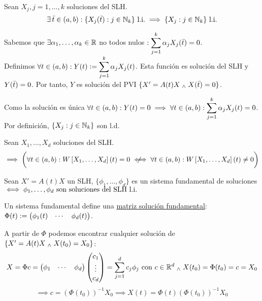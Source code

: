\begin{lem}
	Sean $X_j, j = 1, \dots, k$ soluciones del SLH.
	\[\exists \, \Bar{t} \in (a, b) : \{X_j(\Bar{t}) : j \in \mathbb{N}_k\} \text{ l.i.} \implies \{X_j : j \in \mathbb{N}_k\} \text{ l.i.}\]
	\begin{dem}
		Sabemos que $\exists \alpha_1, \dots, \alpha_k \in \mathbb{R}$ no todos nulos $ : \displaystyle \sum_{j=1}^{k} \alpha_j X_j(\Bar{t}) =0$. \\
		Definimos $\displaystyle \forall t \in (a,b) : Y(t) \vcentcolon= \sum_{j=1}^{k} \alpha_j X_j(t)$. Esta función es solución del SLH y $Y(\Bar{t}) = 0$. Por tanto, $Y$ es solución del PVI $\{X' = A(t)X \; _{\wedge} \; X(\Bar{t}) = 0\}$.

		Como la solución es única $\displaystyle \forall t\in (a, b) : Y(t) = 0 \implies \forall t\in (a, b) : \sum_{j=1}^{k} \alpha_j X_j(t) = 0$.\\
		Por definición, $\{X_j : j \in \mathbb{N}_k\}$ son l.d.
	\end{dem}
\end{lem}

\begin{prop}
	Sean $X_1, \dots, X_d$ soluciones del SLH.
	\[\implies \bigg(\forall t \in (a, b) : W\left[X_1, \dots, X_d\right](t) = 0 \niff  \forall t \in (a, b) : W\left[X_1, \dots, X_d\right](t) \neq 0\bigg)\]
\end{prop}


\begin{defn}
	Sean $X'=A(t)X$ un SLH, $\{\phi_1, \dots, \phi_d\}$ es un sistema fundamental de soluciones $\iff \phi_1, \dots, \phi_d\text{ son soluciones del SLH l.i.}$
\end{defn}

Un sistema fundamental define una \underline{matriz solución fundamental}: $\displaystyle \Phi(t) \vcentcolon= \begin{pmatrix}
		\phi_1(t) & \cdots & \phi_d(t)
	\end{pmatrix}$.

A partir de $\Phi$ podemos encontrar cualquier solución de $\{X'=A(t)X \; _{\wedge} \; X(t_0) = X_0\}$:
\[X=\Phi c = \begin{pmatrix}
		\phi_1 & \cdots & \phi_d
	\end{pmatrix} \begin{pmatrix}
		c_1    \\
		\vdots \\
		c_d
	\end{pmatrix} = \sum_{j=1}^{d} c_j \phi_j \text{ con }c \in \mathbb{R}^d \; _{\wedge} \; X(t_0) = \Phi(t_0) = c=X_0 \]
\[\implies c = \left(\Phi(t_0)\right)^{-1} X_0 \implies \boxed{X(t) = \Phi(t) \left(\Phi(t_0)\right)^{-1} X_0}\]

